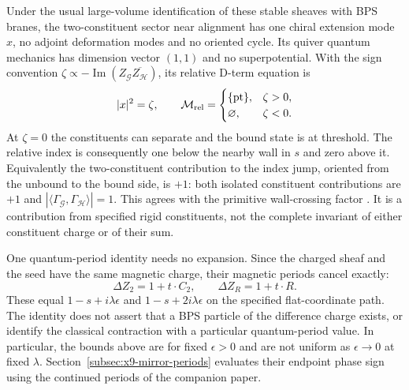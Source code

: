 Under the usual large-volume identification of these stable sheaves
with BPS branes, the two-constituent sector near alignment has one
chiral extension mode $x$, no adjoint deformation modes and no
oriented cycle. Its quiver quantum mechanics has dimension vector
$(1,1)$ and no superpotential. With the sign convention
$\zeta\propto-\operatorname{Im}(Z_{\mathcal G}
\overline{Z_{\mathcal H}})$, its relative D-term equation is
\begin{equation}
 |x|^2=\zeta,\qquad
 \mathcal M_{\rm rel}=
 \begin{cases}
  \{\mathrm{pt}\},&\zeta>0,\\
  \varnothing,&\zeta<0.
 \end{cases}
 \label{eq:x9-probe-quiver-wall}
\end{equation}
At $\zeta=0$ the constituents can separate and the bound state is
at threshold. The relative index is consequently one below the
nearby wall in $s$ and zero above it. Equivalently the two-constituent
contribution to the index jump, oriented from the unbound to the
bound side, is $+1$: both isolated constituent contributions are
$+1$ and $|\langle\Gamma_{\mathcal G},\Gamma_{\mathcal H}\rangle|=1$.
This agrees with the primitive wall-crossing factor
\cite[Section~4.2 and eq.~(5.3)]{Denef:2007Halos}.
It is a contribution from specified rigid constituents, not the
complete invariant of either constituent charge or of their sum.

One quantum-period identity needs no expansion. Since the charged
sheaf and the seed have the same magnetic charge, their magnetic
periods cancel exactly:
\begin{equation}
 \Delta Z_2=1+t\cdot C_2,\qquad
 \Delta Z_R=1+t\cdot R.
 \label{eq:x9-probe-exact-electric-difference}
\end{equation}
These equal $1-s+i\lambda\epsilon$ and
$1-s+2i\lambda\epsilon$ on the specified flat-coordinate path.
The identity does not assert that a BPS particle of the difference
charge exists, or identify the classical contraction with a particular
quantum-period value. In particular, the bounds above are for fixed
$\epsilon>0$ and are not uniform as $\epsilon\to0$ at fixed
$\lambda$. Section~\ref{subsec:x9-mirror-periods} evaluates their endpoint
phase sign using the continued periods of the companion paper.
